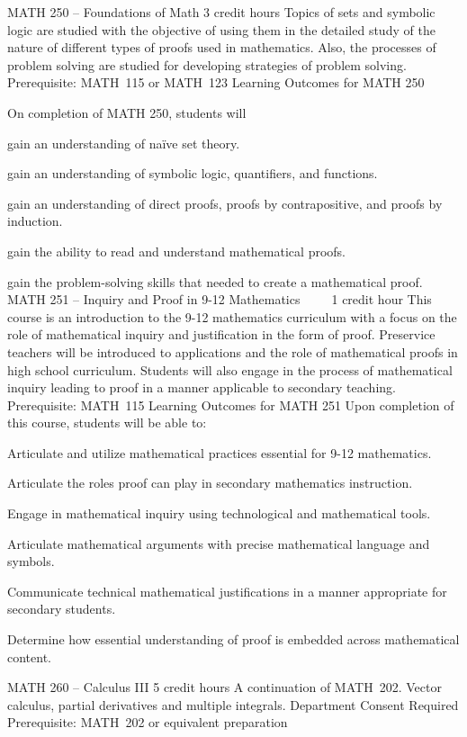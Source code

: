 MATH 250 – Foundations of Math 3 credit hours
Topics of sets and symbolic logic are studied with the objective of using them in the detailed study of the nature of different types of proofs used in mathematics. Also, the processes of problem solving are studied for developing strategies of problem solving.
Prerequisite: MATH 115 or MATH 123
Learning Outcomes for MATH 250

On completion of MATH 250, students will 
    \item gain an understanding of naïve set theory. 
    \item gain an understanding of symbolic logic, quantifiers, and functions.
    \item gain an understanding of direct proofs, proofs by contrapositive, and proofs by induction.
    \item gain the ability to read and understand mathematical proofs.
    \item gain the problem-solving skills that needed to create a mathematical proof.
MATH 251 – Inquiry and Proof in 9-12 Mathematics     1 credit hour
This course is an introduction to the 9-12 mathematics curriculum with a focus on the role of mathematical inquiry and justification in the form of proof. Preservice teachers will be introduced to applications and the role of mathematical proofs in high school curriculum. Students will also engage in the process of mathematical inquiry leading to proof in a manner applicable to secondary teaching.
Prerequisite: MATH 115
Learning Outcomes for MATH 251
Upon completion of this course, students will be able to:
\item Articulate and utilize mathematical practices essential for 9-12 mathematics.  
\item Articulate the roles proof can play in secondary mathematics instruction.
\item Engage in mathematical inquiry using technological and mathematical tools.
\item Articulate mathematical arguments with precise mathematical language and symbols.
\item Communicate technical mathematical justifications in a manner appropriate for secondary students.
\item Determine how essential understanding of proof is embedded across mathematical content.

MATH 260 – Calculus III 5 credit hours
A continuation of MATH 202. Vector calculus, partial derivatives and multiple integrals.
Department Consent Required
Prerequisite: MATH 202 or equivalent preparation


